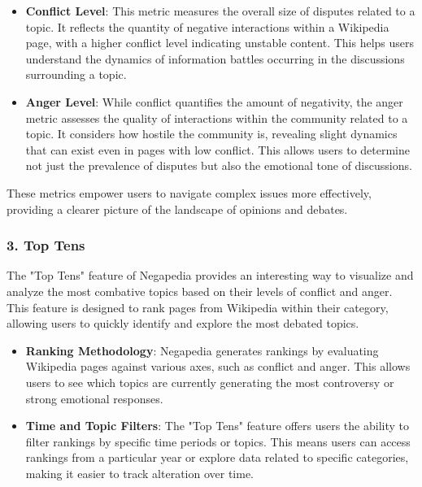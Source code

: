\begin{itemize}
    \item \textbf{Conflict Level}: This metric measures the overall size of disputes related to a topic. It reflects the quantity of negative interactions within a Wikipedia page, with a higher conflict level indicating unstable content. This helps users understand the dynamics of information battles occurring in the discussions surrounding a topic.
    \item \textbf{Anger Level}: While conflict quantifies the amount of negativity, the anger metric assesses the quality of interactions within the community related to a topic. It considers how hostile the community is, revealing slight dynamics that can exist even in pages with low conflict. This allows users to determine not just the prevalence of disputes but also the emotional tone of discussions.
\end{itemize}

These metrics empower users to navigate complex issues more effectively, providing a clearer picture of the landscape of opinions and debates.

\subsubsection{3. Top Tens}

The "Top Tens" feature of Negapedia provides an interesting way to visualize and analyze the most combative topics based on their levels of conflict and anger. This feature is designed to rank pages from Wikipedia within their category, allowing users to quickly identify and explore the most debated topics.

\begin{itemize}
    \item \textbf{Ranking Methodology}: Negapedia generates rankings by evaluating Wikipedia pages against various axes, such as conflict and anger. This allows users to see which topics are currently generating the most controversy or strong emotional responses.
    \item \textbf{Time and Topic Filters}: The "Top Tens" feature offers users the ability to filter rankings by specific time periods or topics. This means users can access rankings from a particular year or explore data related to specific categories, making it easier to track alteration over time.
    \begin{comment}  \item \textbf{Compact Synthesis of Data}: By providing these rankings, Negapedia offers a compact synthesis of negativity that is more digestible than raw data. Users can quickly grasp which topics are lately leading in discussions, enhancing their understanding of societal issues. \end{comment}
\end{itemize}

